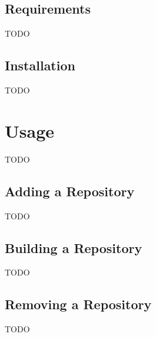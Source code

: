 \documentclass[a4paper]{article}
\begin{document}
			\subsection{Requirements}
				TODO
			\subsection{Installation}
				TODO
		\section{Usage}
			TODO
			\subsection{Adding a Repository}
				TODO
			\subsection{Building a Repository}
				TODO
			\subsection{Removing a Repository}
				TODO
\end{document}
